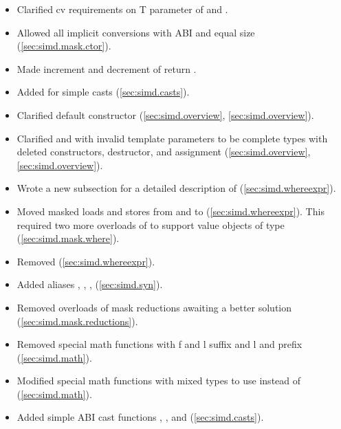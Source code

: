 \begin{itemize}
    \item Clarified cv requirements on \type T parameter of \simd and \mask.
    \item Allowed all implicit \mask conversions with \fixedsize ABI and equal size (\ref{sec:simd.mask.ctor}).
    \item Made increment and decrement of  return .
    \item Added  for simple casts (\ref{sec:simd.casts}).
    \item Clarified default constructor (\ref{sec:simd.overview}, \ref{sec:simd.overview}).
    \item Clarified \simd and \mask with invalid template parameters to be complete types with deleted constructors, destructor, and assignment (\ref{sec:simd.overview}, \ref{sec:simd.overview}).
    \item Wrote a new subsection for a detailed description of  (\ref{sec:simd.whereexpr}).
    \item Moved masked loads and stores from \simd and \mask to  (\ref{sec:simd.whereexpr}).
          This required two more overloads of  to support value objects of type \mask (\ref{sec:simd.mask.where}).
    \item Removed  (\ref{sec:simd.whereexpr}).
    \item Added aliases , , ,  (\ref{sec:simd.syn}).
    \item Removed \bool overloads of mask reductions awaiting a better solution (\ref{sec:simd.mask.reductions}).
    \item Removed special math functions with \code f and \code l suffix and \code l and  prefix (\ref{sec:simd.math}).
    \item Modified special math functions with mixed types to use  instead of  (\ref{sec:simd.math}).
    \item Added simple ABI cast functions , , and  (\ref{sec:simd.casts}).
\end{itemize}

